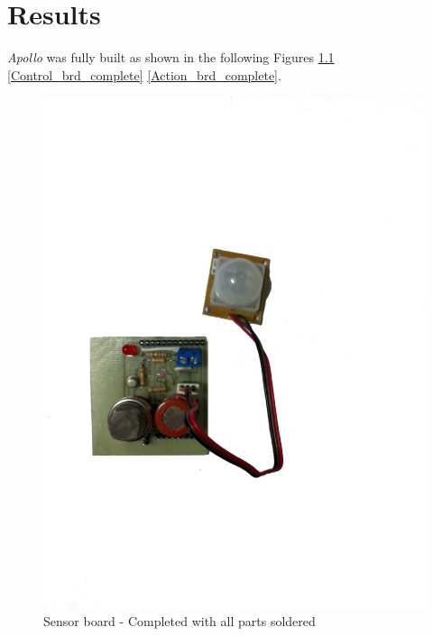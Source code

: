 \documentclass[12pt,a4paper,draft]{report}
\begin{document}
\chapter{Results}
%
\emph{Apollo} was fully built as shown in the following Figures \ref{Sensor_brd_complete} \ref{Control_brd_complete} \ref{Action_brd_complete}.
\begin{figure}[H]
\centering
	\includegraphics*[scale=0.3]{sens_brd_complete}
	\caption{Sensor board - Completed with all parts soldered}
	\label{Sensor_brd_complete}
\end{figure}
\ \\
\end{document}
